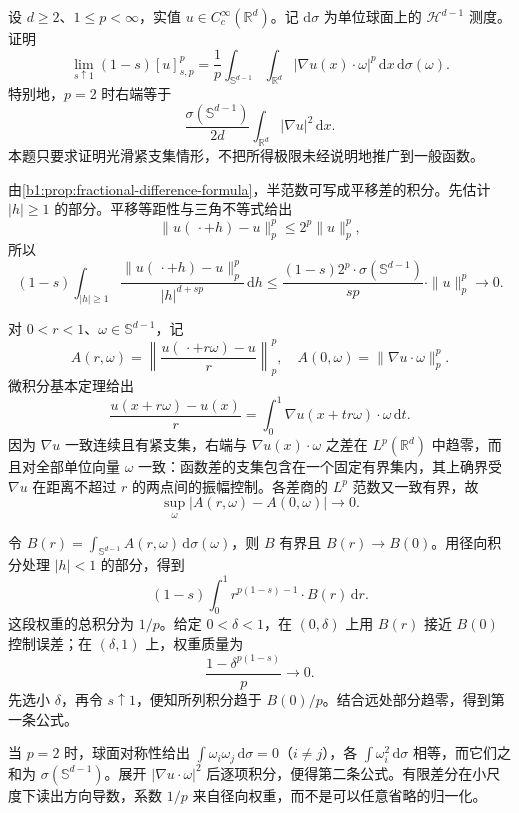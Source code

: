 \begin{optionalexercise}\label{b1:ex:23-smooth-integer-limit}
设 \(d\ge2\)、\(1\le p<\infty\)，实值 \(u\in C_c^\infty(\mathbb R^d)\)。记 \(\mathrm d\sigma\) 为单位球面上的 \(\mathcal H^{d-1}\) 测度。证明
\[
 \lim_{s\uparrow1}(1-s)[u]_{s,p}^p
 =\frac1p\int_{\mathbb S^{d-1}}\int_{\mathbb R^d}
            |\nabla u(x)\cdot\omega|^p\,\mathrm dx\,\mathrm d\sigma(\omega).
\]
特别地，\(p=2\) 时右端等于
\[
 \frac{\sigma(\mathbb S^{d-1})}{2d}
       \int_{\mathbb R^d}|\nabla u|^2\,\mathrm dx.
\]
本题只要求证明光滑紧支集情形，不把所得极限未经说明地推广到一般函数。
\end{optionalexercise}
\begin{solution}
由\cref{b1:prop:fractional-difference-formula}，半范数可写成平移差的积分。先估计 \(|h|\ge1\) 的部分。平移等距性与三角不等式给出
\[
 \|u(\,\cdot+h)-u\|_p^p\le2^p\|u\|_p^p,
\]
所以
\[
 (1-s)\int_{|h|\ge1}
 \frac{\|u(\,\cdot+h)-u\|_p^p}{|h|^{d+sp}}\,\mathrm dh
 \le\frac{(1-s)2^p\cdot \sigma(\mathbb S^{d-1})}{sp}\cdot\|u\|_p^p
 \longrightarrow0.
\]

对 \(0<r<1\)、\(\omega\in\mathbb S^{d-1}\)，记
\[
 A(r,\omega)=
 \left\|\frac{u(\,\cdot+r\omega)-u}{r}\right\|_p^p,
 \quad A(0,\omega)=\|\nabla u\cdot\omega\|_p^p.
\]
微积分基本定理给出
\[
 \frac{u(x+r\omega)-u(x)}r
 =\int_0^1\nabla u(x+tr\omega)\cdot\omega\,\mathrm dt.
\]
因为 \(\nabla u\) 一致连续且有紧支集，右端与
\(\nabla u(x)\cdot\omega\) 之差在 \(L^p(\mathbb R^d)\) 中趋零，而且对全部单位向量 \(\omega\) 一致：函数差的支集包含在一个固定有界集内，其上确界受 \(\nabla u\) 在距离不超过 \(r\) 的两点间的振幅控制。各差商的 \(L^p\) 范数又一致有界，故
\[
 \sup_\omega|A(r,\omega)-A(0,\omega)|\longrightarrow0.
\]

令 \(B(r)=\int_{\mathbb S^{d-1}}A(r,\omega)\,\mathrm d\sigma(\omega)\)，则 \(B\) 有界且 \(B(r)\to B(0)\)。用径向积分处理 \(|h|<1\) 的部分，得到
\[
 (1-s)\int_0^1r^{p(1-s)-1}\cdot B(r)\,\mathrm dr.
\]
这段权重的总积分为 \(1/p\)。给定 \(0<\delta<1\)，在 \((0,\delta)\) 上用 \(B(r)\) 接近 \(B(0)\) 控制误差；在 \((\delta,1)\) 上，权重质量为
\[
 \frac{1-\delta^{p(1-s)}}p\longrightarrow0.
\]
先选小 \(\delta\)，再令 \(s\uparrow1\)，便知所列积分趋于 \(B(0)/p\)。结合远处部分趋零，得到第一条公式。

当 \(p=2\) 时，球面对称性给出
\(\int\omega_i\omega_j\,\mathrm d\sigma=0\)（\(i\ne j\)），各
\(\int\omega_i^2\,\mathrm d\sigma\) 相等，而它们之和为
\(\sigma(\mathbb S^{d-1})\)。展开 \(|\nabla u\cdot\omega|^2\) 后逐项积分，便得第二条公式。有限差分在小尺度下读出方向导数，系数 \(1/p\) 来自径向权重，而不是可以任意省略的归一化。
\end{solution}


